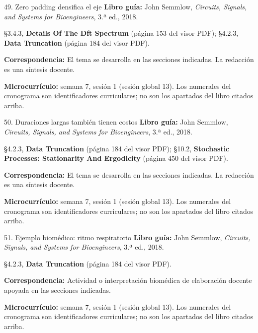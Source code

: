 \documentclass[
  10pt,
  ignorenonframetext,
  aspectratio=169,
  spanish,
]{beamer}
\begin{document}
\begin{frame}{49. Zero padding densifica el eje}
\label{zero-padding-densifica-el-eje}
\textbf{Libro guía:} John Semmlow, \emph{Circuits, Signals, and Systems
for Bioengineers}, 3.ª ed., 2018.

§3.4.3, \textbf{Details Of The Dft Spectrum} (página 153 del visor PDF);
§4.2.3, \textbf{Data Truncation} (página 184 del visor PDF).

\textbf{Correspondencia:} El tema se desarrolla en las secciones
indicadas. La redacción es una síntesis docente.

\textbf{Microcurrículo:} semana 7, sesión 1 (sesión global 13). Los
numerales del cronograma son identificadores curriculares; no son los
apartados del libro citados arriba.
\end{frame}

\begin{frame}{50. Duraciones largas también tienen costos}
\label{duraciones-largas-tambiuxe9n-tienen-costos}
\textbf{Libro guía:} John Semmlow, \emph{Circuits, Signals, and Systems
for Bioengineers}, 3.ª ed., 2018.

§4.2.3, \textbf{Data Truncation} (página 184 del visor PDF); §10.2,
\textbf{Stochastic Processes: Stationarity And Ergodicity} (página 450
del visor PDF).

\textbf{Correspondencia:} El tema se desarrolla en las secciones
indicadas. La redacción es una síntesis docente.

\textbf{Microcurrículo:} semana 7, sesión 1 (sesión global 13). Los
numerales del cronograma son identificadores curriculares; no son los
apartados del libro citados arriba.
\end{frame}

\begin{frame}{51. Ejemplo biomédico: ritmo respiratorio}
\label{ejemplo-biomuxe9dico-ritmo-respiratorio}
\textbf{Libro guía:} John Semmlow, \emph{Circuits, Signals, and Systems
for Bioengineers}, 3.ª ed., 2018.

§4.2.3, \textbf{Data Truncation} (página 184 del visor PDF).

\textbf{Correspondencia:} Actividad o interpretación biomédica de
elaboración docente apoyada en las secciones indicadas.

\textbf{Microcurrículo:} semana 7, sesión 1 (sesión global 13). Los
numerales del cronograma son identificadores curriculares; no son los
apartados del libro citados arriba.
\end{frame}
\end{document}
